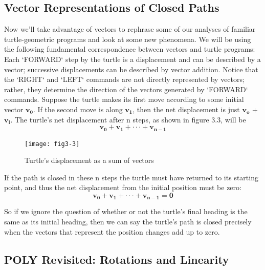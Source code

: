 \documentclass{book}
\begin{document}
\subsection{Vector Representations of Closed Paths}

Now we'll take advantage of vectors to rephrase some of our analyses of
familiar turtle-geometric programs and look at some new phenomena.
We will be using the following fundamental correspondence between vectors and turtle programs: Each \textsc{`FORWARD`} step by the turtle is a displacement and can be described by a vector; successive displacements can
be described by vector addition. Notice that the \textsc{`RIGHT`} and \textsc{`LEFT`} commands are not directly represented by vectors; rather, they determine
the direction of the vectors generated by \textsc{`FORWARD`} commands.
Suppose the turtle makes its first move according to some initial vector \textbf{$\mathbf{v_0}$}. If the second move is along \textbf{$\mathbf{v_1}$}, then the net displacement is just
\textbf{$\mathbf{v_o}$} + \textbf{$\mathbf{v_l}$}. The turtle's net displacement after n steps, as shown in figure
3.3, will be
$$\mathbf{v_0} + \mathbf{v_1} + \cdot \cdot \cdot + \mathbf{v_{n-1}}$$

\begin{figure}
\begin{center}
\texttt{[image: fig3-3]}
\caption{Turtle's displacement as a sum of vectors}
\end{center}
\end{figure}

If the path is closed in these n steps the turtle must have returned to
its starting point, and thus the net displacement from the initial position
must be zero:
$$\mathbf{v_0}+\mathbf{v_1}+ \cdot \cdot \cdot + \mathbf{v_{n-1}} = \mathbf{0}$$

So if we ignore the question of whether or not the turtle's final heading
is the same as its initial heading, then we can say the turtle's path is
closed precisely when the vectors that represent the position changes
add up to zero.

\subsection{POLY Revisited: Rotations and Linearity}
\end{document}
